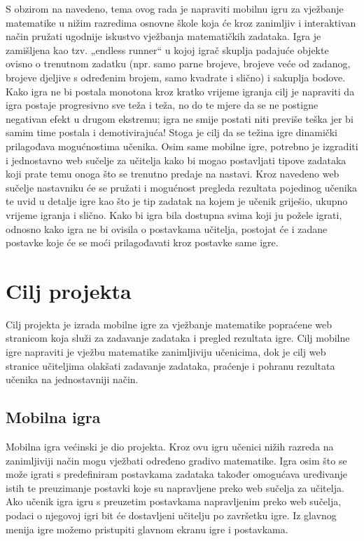 \documentclass[times, utf8, zavrsni, numeric]{fer}
\begin{document}
S obzirom na navedeno, tema ovog rada je napraviti mobilnu igru za vježbanje matematike u nižim razredima osnovne škole koja će kroz zanimljiv i interaktivan način pružati  ugodnije iskustvo
vježbanja matematičkih zadataka. Igra je zamišljena kao tzv. „endless runner“ u kojoj igrač skuplja padajuće objekte ovisno o trenutnom zadatku (npr. samo parne brojeve, brojeve veće od zadanog,
brojeve djeljive s određenim brojem, samo kvadrate i slično) i sakuplja bodove. Kako igra ne bi postala monotona kroz kratko vrijeme igranja cilj je napraviti da igra postaje progresivno sve teža
i teža, no do te mjere da se ne postigne negativan efekt u drugom ekstremu; igra ne smije postati niti previše teška jer bi samim time postala i demotivirajuća! Stoga je cilj da se težina igre
dinamički prilagođava mogućnostima učenika. Osim same mobilne igre, potrebno je izgraditi i jednostavno web sučelje za učitelja kako bi mogao postavljati tipove zadataka koji prate temu onoga što
se trenutno predaje na nastavi. Kroz navedeno web sučelje nastavniku će se pružati i mogućnost pregleda rezultata pojedinog učenika te uvid u detalje igre kao što je tip zadatak na kojem je učenik 
griješio, ukupno vrijeme igranja i slično. Kako bi igra bila dostupna svima koji ju požele igrati, odnosno kako igra ne bi ovisila o postavkama učitelja, postojat će i zadane postavke koje će se moći
 prilagođavati kroz postavke same igre. 



\chapter{Cilj projekta}
Cilj projekta je izrada mobilne igre za vježbanje matematike popraćene web stranicom koja služi za zadavanje zadataka i pregled rezultata igre. Cilj mobilne igre napraviti je vježbu matematike zanimljiviju učenicima, 
dok je cilj web stranice učiteljima olakšati zadavanje zadataka, praćenje i pohranu rezultata učenika na jednostavniji način.

	\section{Mobilna igra}
	Mobilna igra većinski je dio projekta. Kroz ovu igru učenici nižih razreda na zanimljiviji način mogu vježbati određeno gradivo matematike. Igra osim što se može igrati s predefiniram postavkama zadataka također omogućava uređivanje istih
	te preuzimanje postavki koje su napravljene preko web sučelja za učitelja. Ako učenik igra igru s preuzetim postavkama napravljenim preko web sučelja, podaci o njegovoj igri bit će dostavljeni učitelju po završetku igre.
	Iz glavnog menija igre možemo pristupiti glavnom ekranu igre i postavkama.
		
\end{document}

